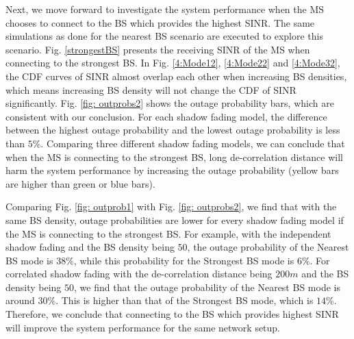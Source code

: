\documentclass[journal,10pt]{IEEEtran}
\begin{document}
 \par Next, we move forward to investigate the system performance when the MS chooses to connect to the BS which provides the highest SINR. The same simulations as done for the nearest BS scenario are executed to explore this scenario. Fig. \ref{strongestBS} presents the receiving SINR of the MS when connecting to the strongest BS. In Fig. \ref{4:Mode12}, \ref{4:Mode22} and \ref{4:Mode32}, the CDF curves of SINR almost overlap each other when increasing BS densities, which means increasing BS density will not change the CDF of SINR significantly. Fig. \ref{fig: outprobs2} shows the outage probability bars, which are consistent with our conclusion. For each shadow fading model, the difference between the highest outage probability and the lowest outage probability is less than $5\%$. Comparing three different shadow fading models, we can conclude that when the MS is connecting to the strongest BS, long de-correlation distance will harm the system performance by increasing the outage probability (yellow bars are higher than green or blue bars). 
 \par Comparing Fig. \ref{fig: outprob1} with Fig. \ref{fig: outprobs2}, we find that with the same BS density, outage probabilities are lower for every shadow fading model if the MS is connecting to the strongest BS. For example, with the independent shadow fading and the BS density being $50$, the outage probability of the Nearest BS mode is $38\%$, while this probability for the Strongest BS mode is $6\%$. For correlated shadow fading with the de-correlation distance being $200m$ and the BS density being $50$, we find that the outage probability of the Nearest BS mode is around $30\%$. This is higher than that of the Strongest BS mode, which is $14\%$. Therefore, we conclude that connecting to the BS which provides highest SINR will improve the system performance for the same network setup. 
\end{document}

